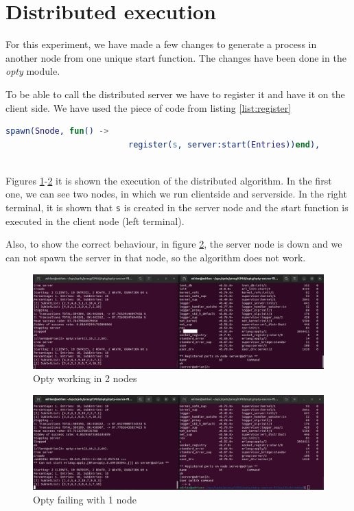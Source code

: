 \documentclass[a4paper, 10pt]{article}
\begin{document}
\section{Distributed execution}

For this experiment, we have made a few changes to generate a process in another node from one unique start function. The changes have been done in the \textit{opty} module. 

To be able to call the distributed server we have to register it and have it on the client side. We have used the piece of code from listing \ref{list:register}


\begin{minipage}{\textwidth}
  \begin{lstlisting}[language=erlang, caption={Register Distributed Server}, label={list:register}]
    spawn(Snode, fun() -> 
                         register(s, server:start(Entries))end),
  
 	\end{lstlisting}
\end{minipage}

Figures \ref{fig:2nodes}-\ref{fig:1node} it is shown the execution of the distributed algorithm. In the first one, we can see two nodes, in which we run clientside and serverside. In the right terminal, it is shown that \texttt{s} is created in the server node and the start function is executed in the client node (left terminal). 

Also, to show the correct behaviour, in figure \ref{fig:1node}, the server node is down and we can not spawn the server in that node, so the algorithm does not work.



\begin{figure}[H]
  \centering
  \includegraphics[width=0.95\linewidth]{images/optyWorking.png}
    \caption{Opty working in 2 nodes}
    \label{fig:2nodes}
\end{figure} 


\begin{figure}[H]
  \centering
  \includegraphics[width=0.95\linewidth]{images/opty1node.png}
    \caption{Opty failing with 1 node}
    \label{fig:1node}
\end{figure} 
\end{document}
